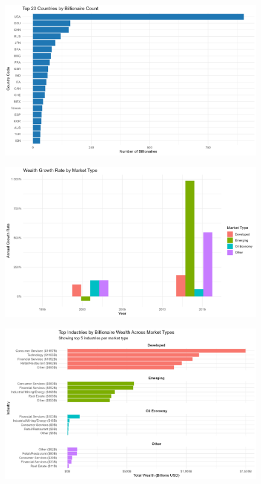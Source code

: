 \documentclass[
  man,floatsintext]{apa6}
\begin{document}
\begin{figure}
\includegraphics[width=0.9\linewidth]{../Question4/Results/topcountries} \caption{ }\label{fig:topcountries-image}
\end{figure}

\begin{figure}
\includegraphics[width=0.9\linewidth]{../Question4/Results/wealthgrowth} \caption{ }\label{fig:wealthgrowth-image}
\end{figure}

\begin{figure}
\includegraphics[width=0.9\linewidth]{../Question4/Results/industrypermarket} \caption{ }\label{fig:industrypermarket-image}
\end{figure}
\end{document}
